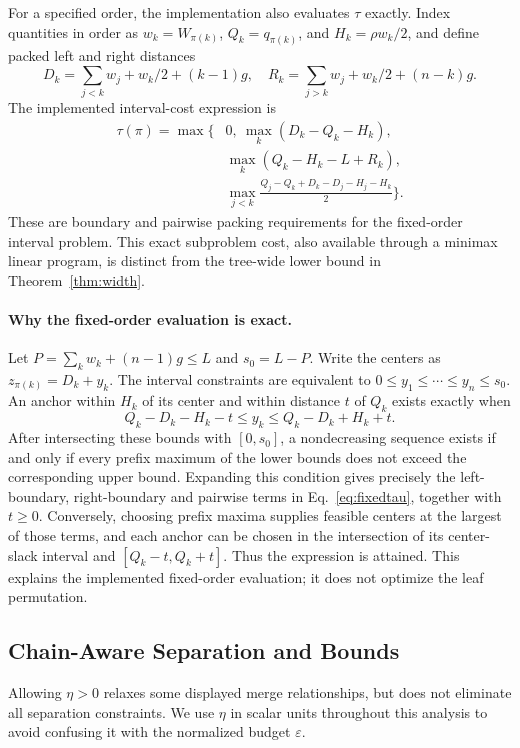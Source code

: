 \documentclass[preprint]{vgtc}   %
\begin{document}
For a specified order, the implementation also evaluates $\tau$ exactly. Index quantities in order as $w_k=W_{\pi(k)}$, $Q_k=q_{\pi(k)}$, and $H_k=\rho w_k/2$, and define packed left and right distances
\[
 D_k=\sum_{j<k}w_j+w_k/2+(k-1)g,\quad
 R_k=\sum_{j>k}w_j+w_k/2+(n-k)g.
\]
The implemented interval-cost expression is
\begin{equation}\label{eq:fixedtau}
\begin{split}
\tau(\pi)=\max\bigg\{&0,\ \max_k(D_k-Q_k-H_k),\\
 &\max_k(Q_k-H_k-L+R_k),\\
 &\max_{j<k}\frac{Q_j-Q_k+D_k-D_j-H_j-H_k}{2}\bigg\}.
\end{split}
\end{equation}
These are boundary and pairwise packing requirements for the fixed-order interval problem. This exact subproblem cost, also available through a minimax linear program, is distinct from the tree-wide lower bound in Theorem~\ref{thm:width}.

\paragraph{Why the fixed-order evaluation is exact.}
Let $P=\sum_k w_k+(n-1)g\le L$ and $s_0=L-P$. Write the centers as $z_{\pi(k)}=D_k+y_k$. The interval constraints are equivalent to $0\le y_1\le\cdots\le y_n\le s_0$. An anchor within $H_k$ of its center and within distance $t$ of $Q_k$ exists exactly when
\[
 Q_k-D_k-H_k-t\le y_k\le Q_k-D_k+H_k+t.
\]
After intersecting these bounds with $[0,s_0]$, a nondecreasing sequence exists if and only if every prefix maximum of the lower bounds does not exceed the corresponding upper bound. Expanding this condition gives precisely the left-boundary, right-boundary and pairwise terms in Eq.~\ref{eq:fixedtau}, together with $t\ge0$. Conversely, choosing prefix maxima supplies feasible centers at the largest of those terms, and each anchor can be chosen in the intersection of its center-slack interval and $[Q_k-t,Q_k+t]$. Thus the expression is attained. This explains the implemented fixed-order evaluation; it does not optimize the leaf permutation.


\subsection{Chain-Aware Separation and Bounds}\label{sec:chain}
Allowing $\eta>0$ relaxes some displayed merge relationships, but does not eliminate all separation constraints. We use $\eta$ in scalar units throughout this analysis to avoid confusing it with the normalized budget $\varepsilon$.
\end{document}
